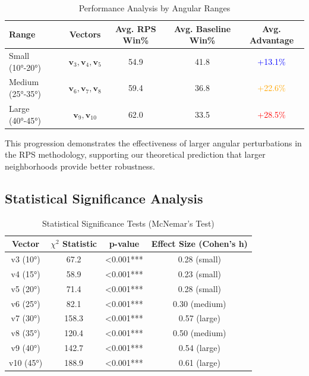 \documentclass{article} %
\begin{document}
\begin{table}[t]
\centering
\caption{Performance Analysis by Angular Ranges}
\label{tab:angle_ranges}
\begin{tabular}{l|c|c|c|c}
\toprule
\textbf{Range} & \textbf{Vectors} & \textbf{Avg. RPS Win\%} & \textbf{Avg. Baseline Win\%} & \textbf{Avg. Advantage} \\
\midrule
Small (10°-20°) & $\mathbf{v}_3, \mathbf{v}_4, \mathbf{v}_5$ & 54.9 & 41.8 & \textcolor{blue}{+13.1\%} \\
Medium (25°-35°) & $\mathbf{v}_6, \mathbf{v}_7, \mathbf{v}_8$ & 59.4 & 36.8 & \textcolor{orange}{+22.6\%} \\
Large (40°-45°) & $\mathbf{v}_9, \mathbf{v}_{10}$ & 62.0 & 33.5 & \textcolor{red}{+28.5\%} \\
\bottomrule
\end{tabular}
\end{table}

This progression demonstrates the effectiveness of larger angular perturbations in the RPS methodology, supporting our theoretical prediction that larger neighborhoods provide better robustness.

\subsection{Statistical Significance Analysis}

\begin{table}[t]
\centering
\caption{Statistical Significance Tests (McNemar's Test)}
\label{tab:statistical_significance}
\begin{tabular}{c|c|c|c}
\toprule
\textbf{Vector} & \textbf{$\chi^2$ Statistic} & \textbf{p-value} & \textbf{Effect Size (Cohen's h)} \\
\midrule
v3 (10°) & 67.2 & <0.001*** & 0.28 (small) \\
v4 (15°) & 58.9 & <0.001*** & 0.23 (small) \\
v5 (20°) & 71.4 & <0.001*** & 0.28 (small) \\
v6 (25°) & 82.1 & <0.001*** & 0.30 (medium) \\
v7 (30°) & 158.3 & <0.001*** & 0.57 (large) \\
v8 (35°) & 120.4 & <0.001*** & 0.50 (medium) \\
v9 (40°) & 142.7 & <0.001*** & 0.54 (large) \\
v10 (45°) & 188.9 & <0.001*** & 0.61 (large) \\
\bottomrule
\end{tabular}
\end{table}
\end{document}
